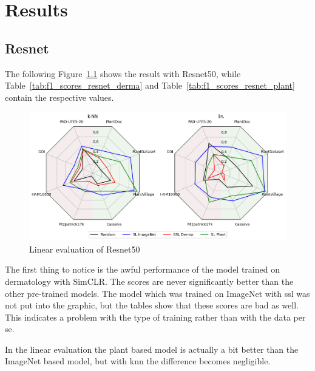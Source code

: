\chapter{Results}

\section{Resnet}


The following Figure~\ref{fig:spider_resnet50} shows the result with Resnet50, while Table~\ref{tab:f1_scores_resnet_derma} and Table~\ref{tab:f1_scores_resnet_plant} contain the respective values.
\begin{figure}[H]
    \begin{center}
    \includegraphics[width=15cm]{../../images/spider_resnet50.png}
    \caption{Linear evaluation of Resnet50}\label{fig:spider_resnet50}
    \end{center}
\end{figure}

The first thing to notice is the awful performance of the model trained on dermatology with SimCLR. The scores are never significantly better than the other pre-trained models. The model which was trained on ImageNet with \gls{ssl} was not put into the graphic, but the tables show that these scores are bad as well. 
This indicates a problem with the type of training rather than with the data per se.

In the linear evaluation the plant based model is actually a bit better than the ImageNet based model, but with \gls{knn} the difference becomes negligible.

